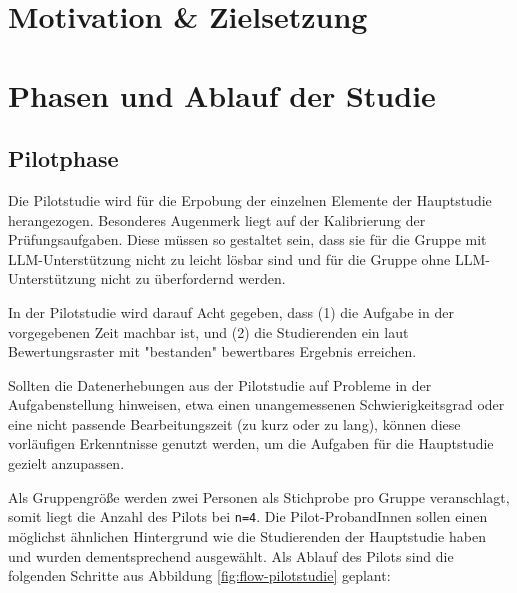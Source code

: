 \section{Motivation \& Zielsetzung}

\section{Phasen und Ablauf der Studie}

\subsection{Pilotphase}
Die Pilotstudie wird für die Erpobung der einzelnen Elemente der Hauptstudie herangezogen. Besonderes Augenmerk liegt auf der Kalibrierung der Prüfungsaufgaben. Diese müssen so gestaltet sein, dass sie für die Gruppe mit LLM-Unterstützung nicht zu leicht lösbar sind und für die Gruppe ohne LLM-Unterstützung nicht zu überfordernd werden.

In der Pilotstudie wird darauf Acht gegeben, dass (1) die Aufgabe in der vorgegebenen Zeit machbar ist, und (2) die Studierenden ein laut Bewertungsraster mit "bestanden" bewertbares Ergebnis erreichen.

Sollten die Datenerhebungen aus der Pilotstudie auf Probleme in der Aufgabenstellung hinweisen, etwa einen unangemessenen Schwierigkeitsgrad oder eine nicht passende Bearbeitungszeit (zu kurz oder zu lang), können diese vorläufigen Erkenntnisse genutzt werden, um die Aufgaben für die Hauptstudie gezielt anzupassen.

Als Gruppengröße werden zwei Personen als Stichprobe pro Gruppe veranschlagt, somit liegt die Anzahl des Pilots bei \texttt{n=4}. Die Pilot-ProbandInnen sollen einen möglichst ähnlichen Hintergrund wie die Studierenden der Hauptstudie haben und wurden dementsprechend ausgewählt. Als Ablauf des Pilots sind die folgenden Schritte aus Abbildung \ref{fig:flow-pilotstudie} geplant:

